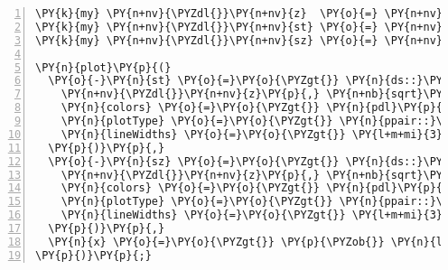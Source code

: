 \begin{Verbatim}[commandchars=\\\{\},numbers=left,firstnumber=1,stepnumber=1]
\PY{k}{my} \PY{n+nv}{\PYZdl{}}\PY{n+nv}{z}  \PY{o}{=} \PY{n+nv}{\PYZdl{}}\PY{n+nv}{result}\PY{o}{-}\PY{o}{\PYZgt{}}\PY{n}{slice}\PY{p}{(}\PY{l+s}{'(1),'}\PY{p}{)}\PY{p}{;}
\PY{k}{my} \PY{n+nv}{\PYZdl{}}\PY{n+nv}{st} \PY{o}{=} \PY{n+nv}{\PYZdl{}}\PY{n+nv}{result}\PY{o}{-}\PY{o}{\PYZgt{}}\PY{n}{slice}\PY{p}{(}\PY{l+s}{'(3),'}\PY{p}{)}\PY{p}{;}
\PY{k}{my} \PY{n+nv}{\PYZdl{}}\PY{n+nv}{sz} \PY{o}{=} \PY{n+nv}{\PYZdl{}}\PY{n+nv}{result}\PY{o}{-}\PY{o}{\PYZgt{}}\PY{n}{slice}\PY{p}{(}\PY{l+s}{'(4),'}\PY{p}{)}\PY{p}{;}

\PY{n}{plot}\PY{p}{(}
  \PY{o}{-}\PY{n}{st} \PY{o}{=}\PY{o}{\PYZgt{}} \PY{n}{ds::}\PY{n}{Pair}\PY{p}{(} 
    \PY{n+nv}{\PYZdl{}}\PY{n+nv}{z}\PY{p}{,} \PY{n+nb}{sqrt}\PY{p}{(} \PY{n+nv}{\PYZdl{}}\PY{n+nv}{st} \PY{o}{/} \PY{n}{maximum}\PY{p}{(}\PY{n+nv}{\PYZdl{}}\PY{n+nv}{st}\PY{p}{)} \PY{p}{)}\PY{p}{,}
    \PY{n}{colors} \PY{o}{=}\PY{o}{\PYZgt{}} \PY{n}{pdl}\PY{p}{(}\PY{l+m+mi}{255}\PY{p}{,}\PY{l+m+mi}{0}\PY{p}{,}\PY{l+m+mi}{0}\PY{p}{)}\PY{o}{-}\PY{o}{\PYZgt{}}\PY{n}{rgb\PYZus{}to\PYZus{}color}\PY{p}{,}
    \PY{n}{plotType} \PY{o}{=}\PY{o}{\PYZgt{}} \PY{n}{ppair::}\PY{n}{Lines}\PY{p}{,}
    \PY{n}{lineWidths} \PY{o}{=}\PY{o}{\PYZgt{}} \PY{l+m+mi}{3}\PY{p}{,}
  \PY{p}{)}\PY{p}{,}
  \PY{o}{-}\PY{n}{sz} \PY{o}{=}\PY{o}{\PYZgt{}} \PY{n}{ds::}\PY{n}{Pair}\PY{p}{(} 
    \PY{n+nv}{\PYZdl{}}\PY{n+nv}{z}\PY{p}{,} \PY{n+nb}{sqrt}\PY{p}{(} \PY{n+nv}{\PYZdl{}}\PY{n+nv}{sz} \PY{o}{/} \PY{n}{maximum}\PY{p}{(}\PY{n+nv}{\PYZdl{}}\PY{n+nv}{sz}\PY{p}{)} \PY{p}{)}\PY{p}{,}
    \PY{n}{colors} \PY{o}{=}\PY{o}{\PYZgt{}} \PY{n}{pdl}\PY{p}{(}\PY{l+m+mi}{0}\PY{p}{,}\PY{l+m+mi}{255}\PY{p}{,}\PY{l+m+mi}{0}\PY{p}{)}\PY{o}{-}\PY{o}{\PYZgt{}}\PY{n}{rgb\PYZus{}to\PYZus{}color}\PY{p}{,}
    \PY{n}{plotType} \PY{o}{=}\PY{o}{\PYZgt{}} \PY{n}{ppair::}\PY{n}{Lines}\PY{p}{,}
    \PY{n}{lineWidths} \PY{o}{=}\PY{o}{\PYZgt{}} \PY{l+m+mi}{3}\PY{p}{,}
  \PY{p}{)}\PY{p}{,}
  \PY{n}{x} \PY{o}{=}\PY{o}{\PYZgt{}} \PY{p}{\PYZob{}} \PY{n}{label} \PY{o}{=}\PY{o}{\PYZgt{}} \PY{l+s}{'Position (m)'} \PY{p}{\PYZcb{}}\PY{p}{,}
\PY{p}{)}\PY{p}{;}
\end{Verbatim}
